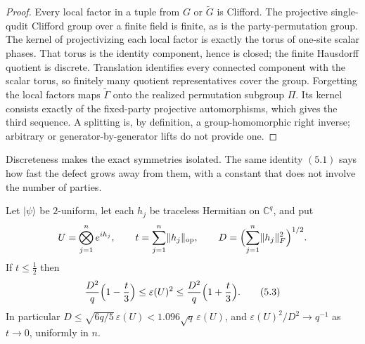\begin{proof}
Every local factor in a tuple from \(G\) or \(\widetilde G\) is
Clifford.  The projective
single-qudit Clifford group over a finite field is finite, as is the
party-permutation group.  The kernel of projectivizing each local factor
is exactly the torus of one-site scalar phases.  That torus is the
identity component, hence is closed; the finite Hausdorff quotient is
discrete.  Translation identifies every connected component with the
scalar torus, so finitely many quotient representatives cover the group.
Forgetting the local factors maps
\(\widetilde\Gamma\) onto the realized permutation subgroup \(\Pi\).
Its kernel consists exactly of the fixed-party projective
automorphisms, which gives the third sequence.  A splitting is, by
definition, a group-homomorphic right inverse; arbitrary or
generator-by-generator lifts do not provide one.
\end{proof}

\AMEFigureThree

Discreteness makes the exact symmetries isolated.  The same identity
\((5.1)\) says how fast the defect grows away from them, with a constant
that does not involve the number of parties.

\begin{theorem}\label{thm:two-uniform-stability}
Let \(\lvert\psi\rangle\) be \(2\)-uniform, let each \(h_j\) be traceless
Hermitian on \(\mathbb C^q\), and put
\[
 U=\bigotimes_{j=1}^ne^{ih_j},\qquad
 t=\sum_{j=1}^n\lVert h_j\rVert_{\mathrm{op}},\qquad
 D=\Bigl(\sum_{j=1}^n\lVert h_j\rVert_F^2\Bigr)^{1/2}.
\]
If \(t\leq\frac12\) then
\[
 \frac{D^2}q\Bigl(1-\frac t3\Bigr)\leq\varepsilon(U)^2
 \leq\frac{D^2}q\Bigl(1+\frac t3\Bigr).                  \tag{5.3}
\]
In particular \(D\leq\sqrt{6q/5}\,\varepsilon(U)<1.096\sqrt q\,
\varepsilon(U)\), and \(\varepsilon(U)^2/D^2\to q^{-1}\) as \(t\to0\),
uniformly in \(n\).
\end{theorem}

